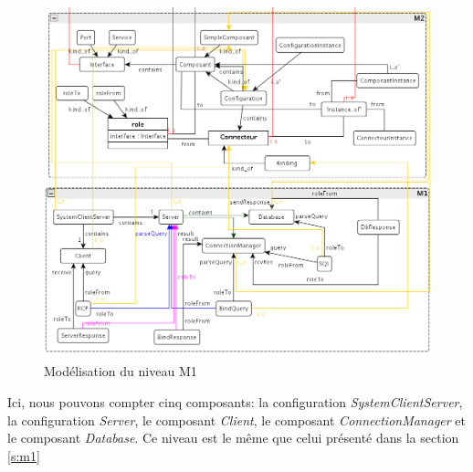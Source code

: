 \documentclass[french,a4paper,titlepage]{article}
\begin{document}
		\begin{figure}[htb]
			\centering
			\includegraphics[width=\textwidth]{m1-new.png}
			\caption{Modélisation du niveau M1}
			\label{fig:m1-new}
		\end{figure}
		
		
		Ici, nous pouvons compter cinq composants: la configuration \emph{SystemClientServer}, la configuration \emph{Server}, le composant \emph{Client}, le composant \emph{ConnectionManager} et le composant \emph{Database}. Ce niveau est le même que celui présenté dans la section \ref{s:m1}
		
			
			

		
		
	
	
	
	
\end{document}
